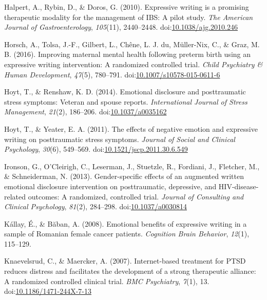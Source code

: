 \documentclass[english,man]{apa6}
\theoremstyle{definition}
\theoremstyle{definition}
\theoremstyle{definition}
\theoremstyle{remark}
\begin{document}
\hypertarget{ref-Halpert2010}{}
Halpert, A., Rybin, D., \& Doros, G. (2010). Expressive writing is a
promising therapeutic modality for the management of IBS: A pilot study.
\emph{The American Journal of Gastroenterology}, \emph{105}(11),
2440--2448.
doi:\href{https://doi.org/10.1038/ajg.2010.246}{10.1038/ajg.2010.246}

\hypertarget{ref-Horsch2016}{}
Horsch, A., Tolsa, J.-F., Gilbert, L., Chêne, L. J. du, Müller-Nix, C.,
\& Graz, M. B. (2016). Improving maternal mental health following
preterm birth using an expressive writing intervention: A randomized
controlled trial. \emph{Child Psychiatry \& Human Development},
\emph{47}(5), 780--791.
doi:\href{https://doi.org/10.1007/s10578-015-0611-6}{10.1007/s10578-015-0611-6}

\hypertarget{ref-Hoyt2014}{}
Hoyt, T., \& Renshaw, K. D. (2014). Emotional disclosure and
posttraumatic stress symptoms: Veteran and spouse reports.
\emph{International Journal of Stress Management}, \emph{21}(2),
186--206. doi:\href{https://doi.org/10.1037/a0035162}{10.1037/a0035162}

\hypertarget{ref-Hoyt2011}{}
Hoyt, T., \& Yeater, E. A. (2011). The effects of negative emotion and
expressive writing on posttraumatic stress symptoms. \emph{Journal of
Social and Clinical Psychology}, \emph{30}(6), 549--569.
doi:\href{https://doi.org/10.1521/jscp.2011.30.6.549}{10.1521/jscp.2011.30.6.549}

\hypertarget{ref-Ironson2013}{}
Ironson, G., O'Cleirigh, C., Leserman, J., Stuetzle, R., Fordiani, J.,
Fletcher, M., \& Schneiderman, N. (2013). Gender-specific effects of an
augmented written emotional disclosure intervention on posttraumatic,
depressive, and HIV-disease-related outcomes: A randomized, controlled
trial. \emph{Journal of Consulting and Clinical Psychology},
\emph{81}(2), 284--298.
doi:\href{https://doi.org/10.1037/a0030814}{10.1037/a0030814}

\hypertarget{ref-Kallay2008}{}
Kállay, É., \& Băban, A. (2008). Emotional benefits of expressive
writing in a sample of Romanian female cancer patients. \emph{Cognition
Brain Behavior}, \emph{12}(1), 115--129.

\hypertarget{ref-Knaevelsrud2007}{}
Knaevelsrud, C., \& Maercker, A. (2007). Internet-based treatment for
PTSD reduces distress and facilitates the development of a strong
therapeutic alliance: A randomized controlled clinical trial. \emph{BMC
Psychiatry}, \emph{7}(1), 13.
doi:\href{https://doi.org/10.1186/1471-244X-7-13}{10.1186/1471-244X-7-13}
\end{document}
